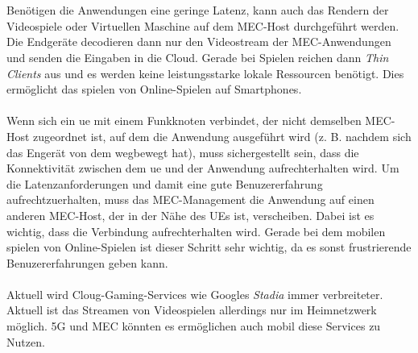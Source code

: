 \documentclass[runningheads]{llncs}
\numberwithin{figure}{section}
\begin{document}
\\
\\
Benötigen die Anwendungen eine geringe Latenz, kann auch das Rendern der Videospiele oder Virtuellen Maschine auf dem MEC-Host 
durchgeführt werden. Die Endgeräte decodieren dann nur den Videostream der MEC-Anwendungen und senden die Eingaben in die Cloud.
Gerade bei Spielen reichen dann \textit{Thin Clients} aus und es werden keine leistungsstarke lokale Ressourcen benötigt. 
Dies ermöglicht das spielen von Online-Spielen auf Smartphones.
\\
\\
Wenn sich ein \acrshort{ue} mit einem Funkknoten verbindet, der nicht demselben MEC-Host zugeordnet ist, 
auf dem die Anwendung ausgeführt wird (z. B. nachdem sich das Engerät von dem wegbewegt hat), 
muss sichergestellt sein, dass die Konnektivität zwischen dem \acrshort{ue} und der Anwendung aufrechterhalten wird. 
Um die Latenzanforderungen und damit eine gute Benuzererfahrung aufrechtzuerhalten, 
muss das MEC-Management die Anwendung auf einen anderen MEC-Host, der in der Nähe des UEs ist, verscheiben. 
Dabei ist es wichtig, dass die Verbindung aufrechterhalten wird. Gerade bei dem mobilen spielen von Online-Spielen
ist dieser Schritt sehr wichtig, da es sonst frustrierende Benuzererfahrungen geben kann.
\\
\\
Aktuell wird Cloug-Gaming-Services wie Googles \textit{Stadia} immer verbreiteter. Aktuell ist das Streamen von Videospielen
allerdings nur im Heimnetzwerk möglich. 5G und MEC könnten es ermöglichen auch mobil diese Services zu Nutzen.
\end{document}
